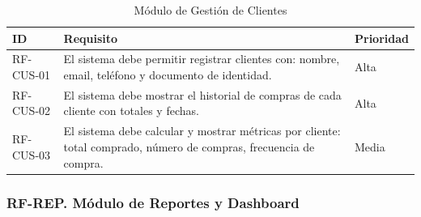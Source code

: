 \begin{longtable}[]{@{}
  >{\raggedright\arraybackslash}p{}
  >{\raggedright\arraybackslash}p{}
  >{\raggedright\arraybackslash}p{}@{}}
\caption[Módulo de Gestión de Clientes]{Módulo de Gestión de Clientes}\tabularnewline
\toprule\noalign{}
\begin{minipage}[b]{\linewidth}\raggedright
ID
\end{minipage} & \begin{minipage}[b]{\linewidth}\raggedright
Requisito
\end{minipage} & \begin{minipage}[b]{\linewidth}\raggedright
Prioridad
\end{minipage} \\
\midrule\noalign{}
\endhead
\bottomrule\noalign{}
\endlastfoot
RF-CUS-01 & El sistema debe permitir registrar clientes con: nombre, email, teléfono y documento de identidad. & Alta \\
RF-CUS-02 & El sistema debe mostrar el historial de compras de cada cliente con totales y fechas. & Alta \\
RF-CUS-03 & El sistema debe calcular y mostrar métricas por cliente: total comprado, número de compras, frecuencia de compra. & Media \\
\end{longtable}

\subsubsection{RF-REP. Módulo de Reportes y Dashboard}\label{rf-rep.-muxf3dulo-de-reportes-y-dashboard}

